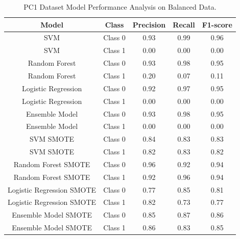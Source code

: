 \documentclass[12pt]{report}
\begin{document}
\begin{table}[ht]
    \centering
    \begin{tabular}{|c|c|c|c|c|}
        \hline
        Model                     & Class   & Precision & Recall & F1-score \\
        \hline
        SVM                       & Class 0 & 0.93      & 0.99   & 0.96     \\
        SVM                       & Class 1 & 0.00      & 0.00   & 0.00     \\
        \hline
        Random Forest             & Class 0 & 0.93      & 0.98   & 0.95     \\
        Random Forest             & Class 1 & 0.20      & 0.07   & 0.11     \\
        \hline
        Logistic Regression       & Class 0 & 0.92      & 0.97   & 0.95     \\
        Logistic Regression       & Class 1 & 0.00      & 0.00   & 0.00     \\
        \hline
        Ensemble Model            & Class 0 & 0.93      & 0.98   & 0.95     \\
        Ensemble Model            & Class 1 & 0.00      & 0.00   & 0.00     \\
        \hline
        SVM SMOTE                 & Class 0 & 0.84      & 0.83   & 0.83     \\
        SVM SMOTE                 & Class 1 & 0.82      & 0.83   & 0.82     \\
        \hline
        Random Forest SMOTE       & Class 0 & 0.96      & 0.92   & 0.94     \\
        Random Forest SMOTE       & Class 1 & 0.92      & 0.96   & 0.94     \\
        \hline
        Logistic Regression SMOTE & Class 0 & 0.77      & 0.85   & 0.81     \\
        Logistic Regression SMOTE & Class 1 & 0.82      & 0.73   & 0.77     \\
        \hline
        Ensemble Model SMOTE      & Class 0 & 0.85      & 0.87   & 0.86     \\
        Ensemble Model SMOTE      & Class 1 & 0.86      & 0.83   & 0.85     \\
        \hline
    \end{tabular}
    \caption{PC1 Dataset Model Performance Analysis on Balanced Data.}
    \label{tab:PC1 Performance Analysis Balanced Data}
\end{table}
\newpage


\end{document}
